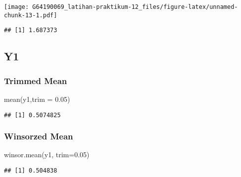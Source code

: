 \documentclass[
]{article}
\newenvironment{Shaded}{\begin{snugshade}}{\end{snugshade}}
\newcommand{\AttributeTok}[1]{\textcolor[rgb]{0.77,0.63,0.00}{#1}}
\newcommand{\FloatTok}[1]{\textcolor[rgb]{0.00,0.00,0.81}{#1}}
\newcommand{\FunctionTok}[1]{\textcolor[rgb]{0.00,0.00,0.00}{#1}}
\newcommand{\NormalTok}[1]{#1}
\newcommand{\OtherTok}[1]{\textcolor[rgb]{0.56,0.35,0.01}{#1}}
\newcommand{\SpecialCharTok}[1]{\textcolor[rgb]{0.00,0.00,0.00}{#1}}
\begin{document}
\texttt{[image: G64190069\_latihan-praktikum-12\_files/figure-latex/unnamed-chunk-13-1.pdf]}

\begin{Shaded}
\end{Shaded}

\begin{verbatim}
## [1] 1.687373
\end{verbatim}

\hypertarget{y1-1}{%
\subsection{Y1}\label{y1-1}}

\hypertarget{trimmed-mean-2}{%
\subsubsection{Trimmed Mean}\label{trimmed-mean-2}}

\begin{Shaded}
\begin{Highlighting}[]
\FunctionTok{mean}\NormalTok{(y1,}\AttributeTok{trim =} \FloatTok{0.05}\NormalTok{)}
\end{Highlighting}
\end{Shaded}

\begin{verbatim}
## [1] 0.5074825
\end{verbatim}

\hypertarget{winsorzed-mean-2}{%
\subsubsection{Winsorzed Mean}\label{winsorzed-mean-2}}

\begin{Shaded}
\begin{Highlighting}[]
\FunctionTok{winsor.mean}\NormalTok{(y1, }\AttributeTok{trim=}\FloatTok{0.05}\NormalTok{)}
\end{Highlighting}
\end{Shaded}

\begin{verbatim}
## [1] 0.504838
\end{verbatim}
\end{document}
